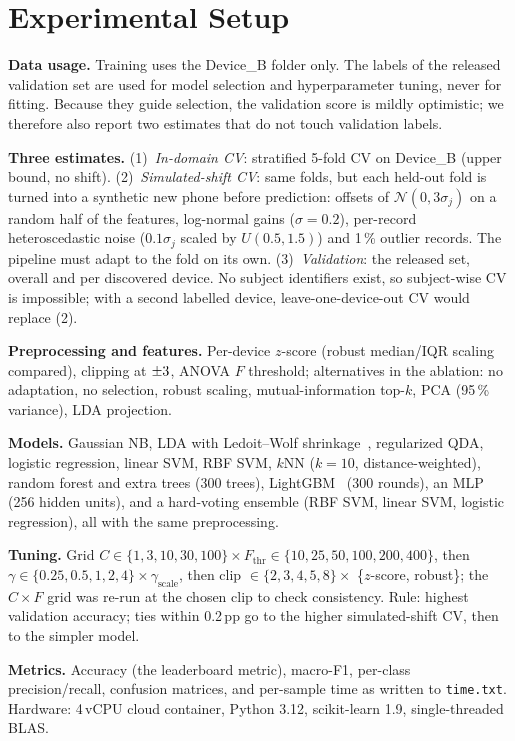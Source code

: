 \section{Experimental Setup}
\label{sec:setup}

\textbf{Data usage.} Training uses the Device\_B folder only. The labels of the released
validation set are used for model selection and hyperparameter tuning, never for fitting.
Because they guide selection, the validation score is mildly optimistic; we therefore also
report two estimates that do not touch validation labels.

\textbf{Three estimates.}
(1)~\emph{In-domain CV}: stratified 5-fold CV on Device\_B (upper bound, no shift).
(2)~\emph{Simulated-shift CV}: same folds, but each held-out fold is turned into a synthetic new
phone before prediction: offsets of $\mathcal{N}(0,3\sigma_j)$ on a random half of the
features, log-normal gains ($\sigma=0.2$), per-record heteroscedastic noise ($0.1\sigma_j$ scaled
by $U(0.5,1.5)$) and 1\,\% outlier records. The pipeline must adapt to the fold on its own.
(3)~\emph{Validation}: the released set, overall and per discovered device.
No subject identifiers exist, so subject-wise CV is impossible; with a second labelled
device, leave-one-device-out CV would replace (2).

\textbf{Preprocessing and features.} Per-device $z$-score (robust median/IQR scaling compared),
clipping at $\pm3$, ANOVA $F$ threshold; alternatives in the ablation: no adaptation, no
selection, robust scaling, mutual-information top-$k$, PCA (95\,\% variance), LDA projection.

\textbf{Models.} Gaussian NB, LDA with Ledoit--Wolf shrinkage~\cite{ledoit2004}, regularized
QDA, logistic regression, linear SVM, RBF SVM, $k$NN ($k=10$, distance-weighted), random forest
and extra trees (300 trees), LightGBM~\cite{ke2017lightgbm} (300 rounds), an MLP (256 hidden
units), and a hard-voting ensemble (RBF SVM, linear SVM, logistic regression), all with the
same preprocessing.

\textbf{Tuning.} Grid $C\in\{1,3,10,30,100\}\times F_{\text{thr}}\in\{10,25,50,100,200,400\}$,
then $\gamma\in\{0.25,0.5,1,2,4\}\times\gamma_{\text{scale}}$, then clip $\in\{2,3,4,5,8\}\times$
\{$z$-score, robust\}; the $C\times F$ grid was re-run at the chosen clip to check consistency. Rule: highest validation
accuracy; ties within 0.2\,pp go to the higher simulated-shift CV, then to the simpler model.

\textbf{Metrics.} Accuracy (the leaderboard metric), macro-F1, per-class precision/recall,
confusion matrices, and per-sample time as written to \texttt{time.txt}. Hardware: 4\,vCPU
cloud container, Python 3.12, scikit-learn 1.9, single-threaded BLAS.
